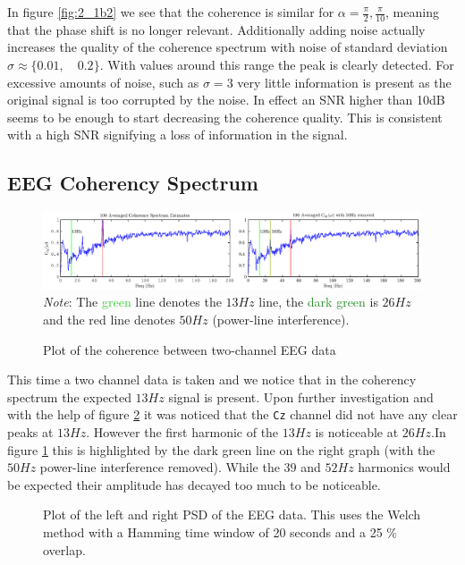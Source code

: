 \documentclass[10pt,twoside,a4paper]{report}
\begin{document}
In figure \ref{fig:2_1b2} we see that the coherence is similar for $\alpha = \frac{\pi}{2}, \frac{\pi}{10}$, meaning that the phase shift is no longer relevant. Additionally adding noise actually increases the quality of the coherence spectrum with noise of standard deviation $\sigma \approx \{0.01, \quad 0.2 \}$. With values around this range the peak is clearly detected. For excessive amounts of noise, such as $\sigma = 3$ very little information is present as the original signal is too corrupted by the noise. In effect an SNR higher than 10dB seems to be enough to start decreasing the coherence quality. This is consistent with a high SNR signifying a loss of information in the signal.

\subsection{EEG Coherency Spectrum}
\begin{figure}[h!]
\centering
\includegraphics[width=\textwidth]{cw2im/1c1.eps}
{\footnotesize \textit{Note}: The \textcolor{LimeGreen}{green} line denotes the $13Hz$ line, the \textcolor{ForestGreen}{dark green} is $26Hz$ and the \textcolor{WildStrawberry}{red} line denotes $50Hz$ (power-line interference).}
\caption{Plot of the coherence between two-channel EEG data}
\label{fig:2_1c1}
\end{figure}
This time a two channel data is taken and we notice that in the coherency spectrum the expected $13Hz$ signal is present. Upon further investigation and with the help of figure \ref{fig:2_1c2} it was noticed that the \texttt{Cz} channel did not have any clear peaks at $13Hz$. However the first harmonic of the $13Hz$ is noticeable at $26Hz$.In figure \ref{fig:2_1c1} this is highlighted by the dark green line on the right graph (with the $50Hz$ power-line interference removed). While the $39$ and $52Hz$ harmonics would be expected their amplitude has decayed too much to be noticeable.
\begin{figure}[h!]
\centering
\resizebox{\textwidth}{!}{}
\caption{Plot of the left and right PSD of the EEG data. This uses the Welch method with a Hamming time window of 20 seconds and a 25 \% overlap.}
\label{fig:2_1c2}
\end{figure}
\end{document}
